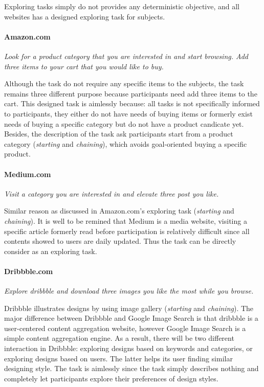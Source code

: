 Exploring tasks simply do not provides any deterministic objective,
and all websites has a designed exploring task for subjects.

\paragraph{Amazon.com} \emph{Look for a product category that you are interested in and start browsing. 
        Add three items to your cart that you would like to buy.}

Although the task do not require any specific items to the subjects, the task remains three different
purpose because participants need add three items to the cart. This designed task 
is aimlessly because: all tasks is not specifically informed to participants, 
they either do not have needs of buying items or 
formerly exist needs of buying a specific category but do not have a product candicate yet.
Besides, the description of the task ask participants start from a product category (\emph{starting} and \emph{chaining}), which avoids 
goal-oriented buying a specific product.

\paragraph{Medium.com} \emph{Visit a category you are interested in and elevate three post you like.}

Similar reason as discussed in Amazon.com's exploring task (\emph{starting} and \emph{chaining}). 
It is well to be remined that Medium is a media
website, visiting a specific article formerly read before participation is relatively difficult 
since all contents showed to users are daily updated. Thus the task can be directly consider as an exploring task.

\paragraph{Dribbble.com} \emph{Explore dribbble and download three images you like the most while you browse.}

Dribbble illustrates designs by using image gallery (\emph{starting} and \emph{chaining}). 
The major difference between Dribbble and Google Image Search
is that dribbble is a user-centered content aggregation website, however Google Image Search is a simple content aggregation engine.
As a result, there will be two different interaction in Dribbble: exploring designs based on keywords and categories,
or exploring designs based on users. The latter helps its user finding similar designing style.
The task is aimlessly since the task simply describes nothing and completely let participants explore their preferences
of design styles.

